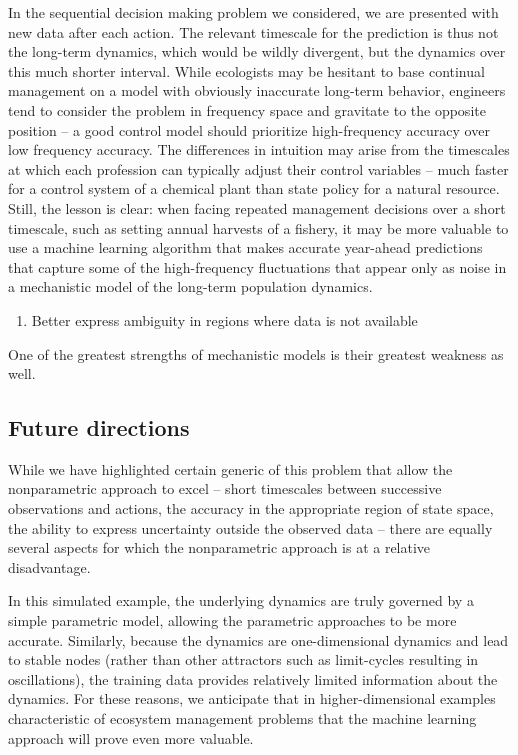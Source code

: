 \documentclass[author-year, review]{elsarticle} %
\begin{document}
In the sequential decision making problem we considered, we are
presented with new data after each action. The relevant timescale for
the prediction is thus not the long-term dynamics, which would be wildly
divergent, but the dynamics over this much shorter interval. While
ecologists may be hesitant to base continual management on a model with
obviously inaccurate long-term behavior, engineers tend to consider the
problem in frequency space and gravitate to the opposite position -- a
good control model should prioritize high-frequency accuracy over low
frequency accuracy. The differences in intuition may arise from the
timescales at which each profession can typically adjust their control
variables -- much faster for a control system of a chemical plant than
state policy for a natural resource. Still, the lesson is clear: when
facing repeated management decisions over a short timescale, such as
setting annual harvests of a fishery, it may be more valuable to use a
machine learning algorithm that makes accurate year-ahead predictions
that capture some of the high-frequency fluctuations that appear only as
noise in a mechanistic model of the long-term population dynamics.

\begin{enumerate}
\def\labelenumi{\arabic{enumi}.}
\setcounter{enumi}{1}
\itemsep1pt\parskip0pt
\item
  Better express ambiguity in regions where data is not available
\end{enumerate}

One of the greatest strengths of mechanistic models is their greatest
weakness as well.

\subsection{Future directions}

While we have highlighted certain generic of this problem that allow the
nonparametric approach to excel -- short timescales between successive
observations and actions, the accuracy in the appropriate region of
state space, the ability to express uncertainty outside the observed
data -- there are equally several aspects for which the nonparametric
approach is at a relative disadvantage.

In this simulated example, the underlying dynamics are truly governed by
a simple parametric model, allowing the parametric approaches to be more
accurate. Similarly, because the dynamics are one-dimensional dynamics
and lead to stable nodes (rather than other attractors such as
limit-cycles resulting in oscillations), the training data provides
relatively limited information about the dynamics. For these reasons, we
anticipate that in higher-dimensional examples characteristic of
ecosystem management problems that the machine learning approach will
prove even more valuable.
\end{document}
